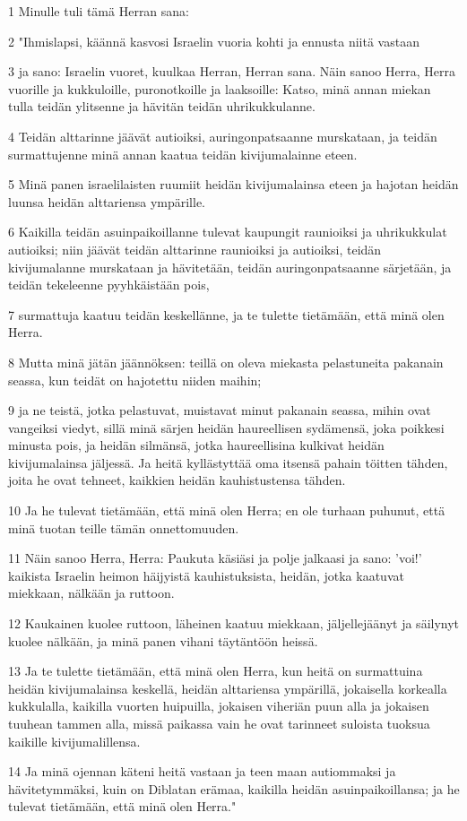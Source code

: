 \par 1 Minulle tuli tämä Herran sana:
\par 2 "Ihmislapsi, käännä kasvosi Israelin vuoria kohti ja ennusta niitä vastaan
\par 3 ja sano: Israelin vuoret, kuulkaa Herran, Herran sana. Näin sanoo Herra, Herra vuorille ja kukkuloille, puronotkoille ja laaksoille: Katso, minä annan miekan tulla teidän ylitsenne ja hävitän teidän uhrikukkulanne.
\par 4 Teidän alttarinne jäävät autioiksi, auringonpatsaanne murskataan, ja teidän surmattujenne minä annan kaatua teidän kivijumalainne eteen.
\par 5 Minä panen israelilaisten ruumiit heidän kivijumalainsa eteen ja hajotan heidän luunsa heidän alttariensa ympärille.
\par 6 Kaikilla teidän asuinpaikoillanne tulevat kaupungit raunioiksi ja uhrikukkulat autioiksi; niin jäävät teidän alttarinne raunioiksi ja autioiksi, teidän kivijumalanne murskataan ja hävitetään, teidän auringonpatsaanne särjetään, ja teidän tekeleenne pyyhkäistään pois,
\par 7 surmattuja kaatuu teidän keskellänne, ja te tulette tietämään, että minä olen Herra.
\par 8 Mutta minä jätän jäännöksen: teillä on oleva miekasta pelastuneita pakanain seassa, kun teidät on hajotettu niiden maihin;
\par 9 ja ne teistä, jotka pelastuvat, muistavat minut pakanain seassa, mihin ovat vangeiksi viedyt, sillä minä särjen heidän haureellisen sydämensä, joka poikkesi minusta pois, ja heidän silmänsä, jotka haureellisina kulkivat heidän kivijumalainsa jäljessä. Ja heitä kyllästyttää oma itsensä pahain töitten tähden, joita he ovat tehneet, kaikkien heidän kauhistustensa tähden.
\par 10 Ja he tulevat tietämään, että minä olen Herra; en ole turhaan puhunut, että minä tuotan teille tämän onnettomuuden.
\par 11 Näin sanoo Herra, Herra: Paukuta käsiäsi ja polje jalkaasi ja sano: 'voi!' kaikista Israelin heimon häijyistä kauhistuksista, heidän, jotka kaatuvat miekkaan, nälkään ja ruttoon.
\par 12 Kaukainen kuolee ruttoon, läheinen kaatuu miekkaan, jäljellejäänyt ja säilynyt kuolee nälkään, ja minä panen vihani täytäntöön heissä.
\par 13 Ja te tulette tietämään, että minä olen Herra, kun heitä on surmattuina heidän kivijumalainsa keskellä, heidän alttariensa ympärillä, jokaisella korkealla kukkulalla, kaikilla vuorten huipuilla, jokaisen viheriän puun alla ja jokaisen tuuhean tammen alla, missä paikassa vain he ovat tarinneet suloista tuoksua kaikille kivijumalillensa.
\par 14 Ja minä ojennan käteni heitä vastaan ja teen maan autiommaksi ja hävitetymmäksi, kuin on Diblatan erämaa, kaikilla heidän asuinpaikoillansa; ja he tulevat tietämään, että minä olen Herra."

